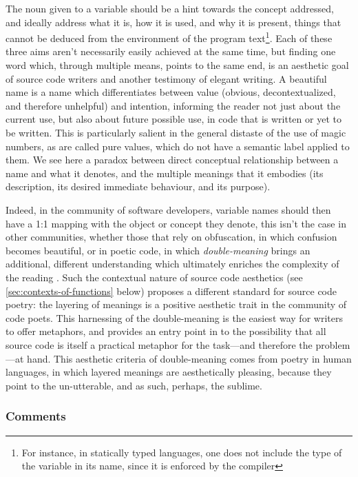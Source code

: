 The noun given to a variable should be a hint towards the concept addressed, and ideally address what it is, how it is used, and why it is present, things that cannot be deduced from the environment of the program text\footnote{For instance, in statically typed languages, one does not include the type of the variable in its name, since it is enforced by the compiler}. Each of these three aims aren't necessarily easily achieved at the same time, but finding one word which, through multiple means, points to the same end, is an aesthetic goal of source code writers and another testimony of elegant writing. A beautiful name is a name which differentiates between value (obvious, decontextualized, and therefore unhelpful) and intention, informing the reader not just about the current use, but also about future possible use, in code that is written or yet to be written. This is particularly salient in the general distaste of the use of magic numbers, as are called pure values, which do not have a semantic label applied to them. We see here a paradox between direct conceptual relationship between a name and what it denotes, and the multiple meanings that it embodies (its description, its desired immediate behaviour, and its purpose).

Indeed, in the community of software developers, variable names should then have a 1:1 mapping with the object or concept they denote, this isn't the case in other communities, whether those that rely on obfuscation, in which confusion becomes beautiful, or in poetic code, in which \emph{double-meaning} brings an additional, different understanding which ultimately enriches the complexity of the reading \citep{knuth_literate_1984}.  Such the contextual nature of source code aesthetics (see \ref{sec:contexts-of-functions} below) proposes a different standard for source code poetry: the layering of meanings is a positive aesthetic trait in the community of code poets. This harnessing of the double-meaning is the easiest way for writers to offer metaphors, and provides an entry point in to the possibility that all source code is itself a practical metaphor for the task—and therefore the problem—at hand. This aesthetic criteria of double-meaning comes from poetry in human languages, in which layered meanings are aesthetically pleasing, because they point to the un-utterable, and as such, perhaps, the sublime\citep{aquilina_computational_2015}.

\subsubsection{Comments}
\label{subsubsec:framework-comments}

